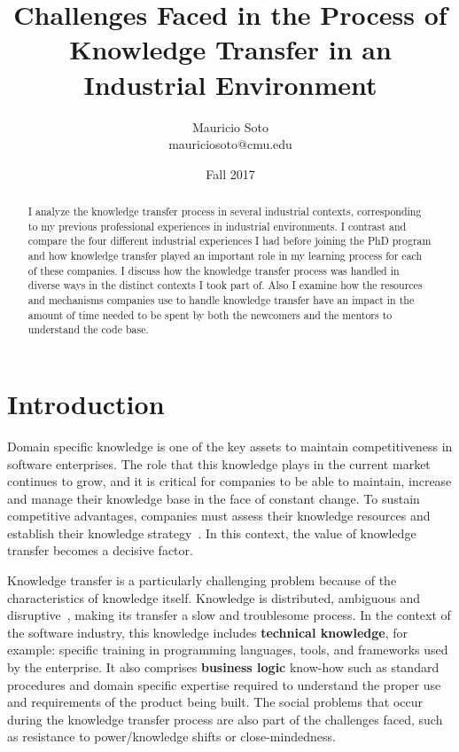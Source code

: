 \documentclass[12pt, letterpaper]{article}
\title{Challenges Faced in the Process of Knowledge Transfer in an Industrial Environment}
\author{Mauricio Soto\\
mauriciosoto@cmu.edu
}
\date{Fall 2017}
\begin{document}
 
\begin{titlepage}
\maketitle


\begin{abstract}
I analyze the knowledge transfer process in several industrial contexts, corresponding to my 
previous professional experiences in industrial environments.
I contrast and compare the four different industrial experiences I had before joining the PhD program and 
how knowledge transfer played an important role in my learning process for each of these companies.
I discuss how the knowledge transfer process was handled in diverse ways in the distinct contexts I took part
of. Also I examine how the resources and mechanisms companies use to handle knowledge transfer have an impact in the 
amount of time needed to be spent by both the newcomers and the mentors to understand the code base. 
\end{abstract}
\end{titlepage}
 
\section{Introduction}

Domain specific knowledge is one of the key assets to maintain competitiveness in 
software enterprises.
The role that this knowledge plays in the current market continues to grow, and it 
is critical for companies to be able to maintain, increase and manage their knowledge base in the face 
of constant change. To sustain competitive advantages, companies must assess their knowledge resources and 
establish their knowledge strategy~\cite{civi00}. In this context, the value of knowledge transfer 
becomes a decisive factor.

Knowledge transfer is a particularly challenging problem because of the characteristics of
knowledge itself. Knowledge is distributed, ambiguous and 
disruptive~\cite{Newell06}, making its transfer a
slow and troublesome process. 
In the context of the software industry, this knowledge includes \textbf{technical
knowledge}, for example: specific training in 
programming languages, tools, and frameworks used by the enterprise. It also comprises
\textbf{business logic} know-how such as standard procedures and domain specific 
expertise required to understand the proper use and requirements of the product being built.
The social problems that occur during the knowledge transfer process are also part of the 
challenges faced, such as resistance to power/knowledge shifts or close-mindedness.
\end{document}

